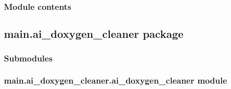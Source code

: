\documentclass[letterpaper,10pt,english]{sphinxmanual}
\begin{document}
\subsubsection{Module contents}
\label{\detokenize{main.DoxygenWarningFixer:module-main.DoxygenWarningFixer}}\label{\detokenize{main.DoxygenWarningFixer:module-contents}}
\sphinxstepscope


\subsection{main.ai\_doxygen\_cleaner package}
\label{\detokenize{main.ai_doxygen_cleaner:main-ai-doxygen-cleaner-package}}\label{\detokenize{main.ai_doxygen_cleaner::doc}}

\subsubsection{Submodules}
\label{\detokenize{main.ai_doxygen_cleaner:submodules}}

\subsubsection{main.ai\_doxygen\_cleaner.ai\_doxygen\_cleaner module}
\label{\detokenize{main.ai_doxygen_cleaner:module-main.ai_doxygen_cleaner.ai_doxygen_cleaner}}\label{\detokenize{main.ai_doxygen_cleaner:main-ai-doxygen-cleaner-ai-doxygen-cleaner-module}}
\end{document}
